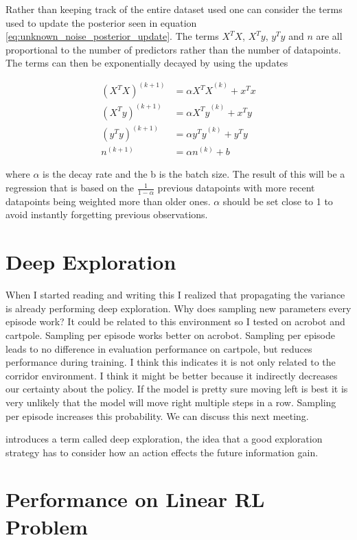 Rather than keeping track of the entire dataset used one can consider the terms used to update the posterior seen in equation \ref{eq:unknown_noise_posterior_update}. The terms $X^TX$, $X^Ty$, $y^Ty$ and $n$ are all proportional to the number of predictors rather than the number of datapoints. The terms can then be exponentially decayed by using the updates 

\begin{align}
    (X^TX)^{(k+1)} &= \alpha{X^TX}^{(k)} + x^Tx \\
    (X^Ty)^{(k+1)} &= \alpha{X^Ty}^{(k)} + x^Ty \\
    (y^Ty)^{(k+1)} &= \alpha{y^Ty}^{(k)} + y^Ty \\
    n^{(k+1)} &= \alpha n^{(k)} + b 
\end{align}

where $\alpha$ is the decay rate and the b is the batch size. The result of this will be a regression that is based on the $\frac{1}{1-\alpha}$ previous datapoints with more recent datapoints being weighted more than older ones.  $\alpha$ should be set close to 1 to avoid instantly forgetting previous observations.

\section{Deep Exploration}

\todo When I started reading and writing this I realized that propagating the variance is already performing deep exploration. Why does sampling new parameters every episode work? It could be related to this environment so I tested on acrobot and cartpole. Sampling per episode works better on acrobot. Sampling per episode leads to no difference in evaluation performance on cartpole, but reduces performance during training. I think this indicates it is not only related to the corridor environment. I think it might be better because it indirectly decreases our certainty about the policy. If the model is pretty sure moving left is best it is very unlikely that the model will move right multiple steps in a row. Sampling per episode increases this probability. We can discuss this next meeting.

\cite{osband_2018} introduces a term called deep exploration, the idea that a good exploration strategy has to consider how an action effects the future information gain.

\section{Performance on Linear RL Problem}

